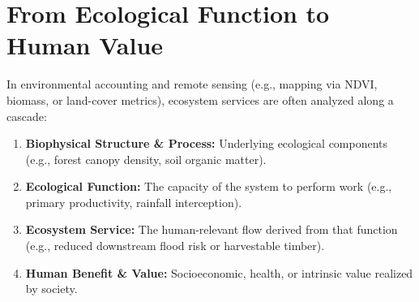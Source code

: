 \documentclass[11pt,a4paper]{article}
\begin{document}
\section{From Ecological Function to Human Value}
In environmental accounting and remote sensing (e.g., mapping via NDVI, biomass, or land-cover metrics), ecosystem services are often analyzed along a cascade:
\begin{enumerate}[label=\textbf{\arabic*.}]
    \item \textbf{Biophysical Structure \& Process:} Underlying ecological components (e.g., forest canopy density, soil organic matter).
    \item \textbf{Ecological Function:} The capacity of the system to perform work (e.g., primary productivity, rainfall interception).
    \item \textbf{Ecosystem Service:} The human-relevant flow derived from that function (e.g., reduced downstream flood risk or harvestable timber).
    \item \textbf{Human Benefit \& Value:} Socioeconomic, health, or intrinsic value realized by society.
\end{enumerate}
\end{document}
